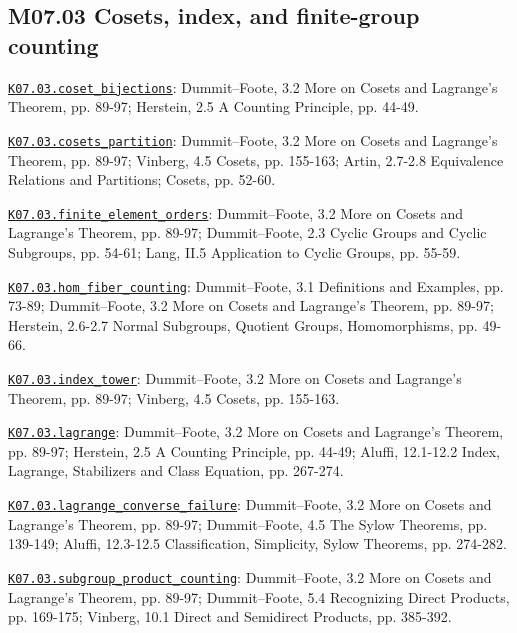 \subsection*{M07.03 Cosets, index, and finite-group counting}
\par\smallskip\noindent\hypertarget{src:K07.03.coset_bijections}{}\label{src:K07.03.coset_bijections}\hyperref[K07.03.coset_bijections]{\texttt{K07.03.coset\_bijections}}: Dummit--Foote, 3.2 More on Cosets and Lagrange's Theorem, pp. 89-97; Herstein, 2.5 A Counting Principle, pp. 44-49.
\par\smallskip\noindent\hypertarget{src:K07.03.cosets_partition}{}\label{src:K07.03.cosets_partition}\hyperref[K07.03.cosets_partition]{\texttt{K07.03.cosets\_partition}}: Dummit--Foote, 3.2 More on Cosets and Lagrange's Theorem, pp. 89-97; Vinberg, 4.5 Cosets, pp. 155-163; Artin, 2.7-2.8 Equivalence Relations and Partitions; Cosets, pp. 52-60.
\par\smallskip\noindent\hypertarget{src:K07.03.finite_element_orders}{}\label{src:K07.03.finite_element_orders}\hyperref[K07.03.finite_element_orders]{\texttt{K07.03.finite\_element\_orders}}: Dummit--Foote, 3.2 More on Cosets and Lagrange's Theorem, pp. 89-97; Dummit--Foote, 2.3 Cyclic Groups and Cyclic Subgroups, pp. 54-61; Lang, II.5 Application to Cyclic Groups, pp. 55-59.
\par\smallskip\noindent\hypertarget{src:K07.03.hom_fiber_counting}{}\label{src:K07.03.hom_fiber_counting}\hyperref[K07.03.hom_fiber_counting]{\texttt{K07.03.hom\_fiber\_counting}}: Dummit--Foote, 3.1 Definitions and Examples, pp. 73-89; Dummit--Foote, 3.2 More on Cosets and Lagrange's Theorem, pp. 89-97; Herstein, 2.6-2.7 Normal Subgroups, Quotient Groups, Homomorphisms, pp. 49-66.
\par\smallskip\noindent\hypertarget{src:K07.03.index_tower}{}\label{src:K07.03.index_tower}\hyperref[K07.03.index_tower]{\texttt{K07.03.index\_tower}}: Dummit--Foote, 3.2 More on Cosets and Lagrange's Theorem, pp. 89-97; Vinberg, 4.5 Cosets, pp. 155-163.
\par\smallskip\noindent\hypertarget{src:K07.03.lagrange}{}\label{src:K07.03.lagrange}\hyperref[K07.03.lagrange]{\texttt{K07.03.lagrange}}: Dummit--Foote, 3.2 More on Cosets and Lagrange's Theorem, pp. 89-97; Herstein, 2.5 A Counting Principle, pp. 44-49; Aluffi, 12.1-12.2 Index, Lagrange, Stabilizers and Class Equation, pp. 267-274.
\par\smallskip\noindent\hypertarget{src:K07.03.lagrange_converse_failure}{}\label{src:K07.03.lagrange_converse_failure}\hyperref[K07.03.lagrange_converse_failure]{\texttt{K07.03.lagrange\_converse\_failure}}: Dummit--Foote, 3.2 More on Cosets and Lagrange's Theorem, pp. 89-97; Dummit--Foote, 4.5 The Sylow Theorems, pp. 139-149; Aluffi, 12.3-12.5 Classification, Simplicity, Sylow Theorems, pp. 274-282.
\par\smallskip\noindent\hypertarget{src:K07.03.subgroup_product_counting}{}\label{src:K07.03.subgroup_product_counting}\hyperref[K07.03.subgroup_product_counting]{\texttt{K07.03.subgroup\_product\_counting}}: Dummit--Foote, 3.2 More on Cosets and Lagrange's Theorem, pp. 89-97; Dummit--Foote, 5.4 Recognizing Direct Products, pp. 169-175; Vinberg, 10.1 Direct and Semidirect Products, pp. 385-392.

